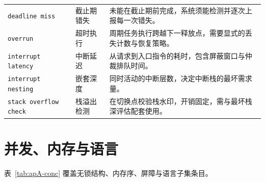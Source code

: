 \documentclass[12pt,a4paper,fontset=fandol]{ctexbook}
\newcommand{\Tp}[1]{\texttt{#1}}
\begin{document}
\begin{longtable}{@{} >{\raggedright\arraybackslash}p{} >{\raggedright\arraybackslash}p{} >{\raggedright\arraybackslash}p{}@{}}
\Tp{deadline miss} & 截止期错失 & 未能在截止期前完成，系统须能检测并逐次上报每一次错失。 \\
\Tp{overrun} & 超时执行 & 周期任务执行跨越下一释放点，需要显式的丢失计数与恢复策略。 \\
\Tp{interrupt latency} & 中断延迟 & 从请求到入口指令的耗时，包含屏蔽窗口与仲裁排队时间。 \\
\Tp{interrupt nesting} & 嵌套深度 & 同时活动的中断层数，决定中断栈的最坏需求量。 \\
\Tp{stack overflow check} & 栈溢出检测 & 在切换点校验栈水印，开销固定，需与最坏栈深评估配套使用。 \\
\end{longtable}

\section{并发、内存与语言}

表~\ref{tab:apA-conc} 覆盖无锁结构、内存序、屏障与语言子集条目。
\end{document}

